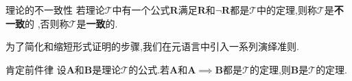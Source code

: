 \begin{definition}{理论的不一致性}{}
	若理论$\mathcal{T}$中有一个公式$\boldsymbol{R}$满足$\boldsymbol{R}$和$\neg\boldsymbol{R}$都是$\mathcal{T}$中的定理,则称$\mathcal{T}$是\textbf{不一致}的 ,否则称$\mathcal{T}$是\textbf{一致}的.
\end{definition}

为了简化和缩短形式证明的步骤,我们在元语言中引入一系列演绎准则.

\begin{metatheorem}{肯定前件律}{}
	设$\boldsymbol{A}$和$\boldsymbol{B}$是理论$\mathcal{T}$的公式.若$\boldsymbol{A}$和$\boldsymbol{A}\implies\boldsymbol{B}$都是$\mathcal{T}$的定理,则$\boldsymbol{B}$是$\mathcal{T}$的定理.
\end{metatheorem}

